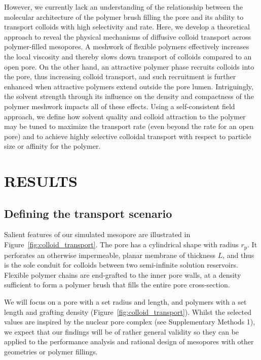 \documentclass[12pt, a4paper]{article}
\begin{document}
However, we currently lack an understanding of the relationship between the molecular architecture of the polymer brush filling the pore and its ability to transport colloids with high selectivity and rate. Here, we develop a theoretical approach to reveal the physical mechanisms of diffusive colloid transport across polymer-filled mesopores.
A meshwork of flexible polymers effectively increases the local viscosity and thereby slows down transport of colloids compared to an open pore. 
On the other hand, an attractive polymer phase recruits colloids into the pore, thus increasing colloid transport, and such recruitment is further enhanced when attractive polymers extend outside the pore lumen. 
Intriguingly, the solvent strength through its influence on the density and compactness of the polymer meshwork impacts all of these effects. 
Using a self-consistent field approach, we define how solvent quality and colloid attraction to the polymer may be tuned to maximize the transport rate (even beyond the rate for an open pore) and to achieve highly selective colloidal transport with respect to particle size or affinity for the polymer.


\section{RESULTS}


\subsection{Defining the transport scenario}

Salient features of our simulated mesopore are illustrated in Figure~\ref{fig:colloid_transport}.
The pore has a cylindrical shape with radius $r_{\text{p}}$.
It perforates an otherwise impermeable, planar membrane of thickness $L$, and thus is the sole conduit for colloids between two semi-infinite solution reservoirs.
Flexible polymer chains are end-grafted to the inner pore walls, at a density sufficient to form a polymer brush that fills the entire pore cross-section.

We will focus on a pore with a set radius and length, and polymers with a set length and grafting density (Figure~\ref{fig:colloid_transport}).
Whilst the selected values are inspired by the nuclear pore complex (see Supplementary Methods 1), we expect that our findings will be of rather general validity so they can be applied to the performance analysis and rational design of mesopores with other geometries or polymer fillings.
\end{document}
